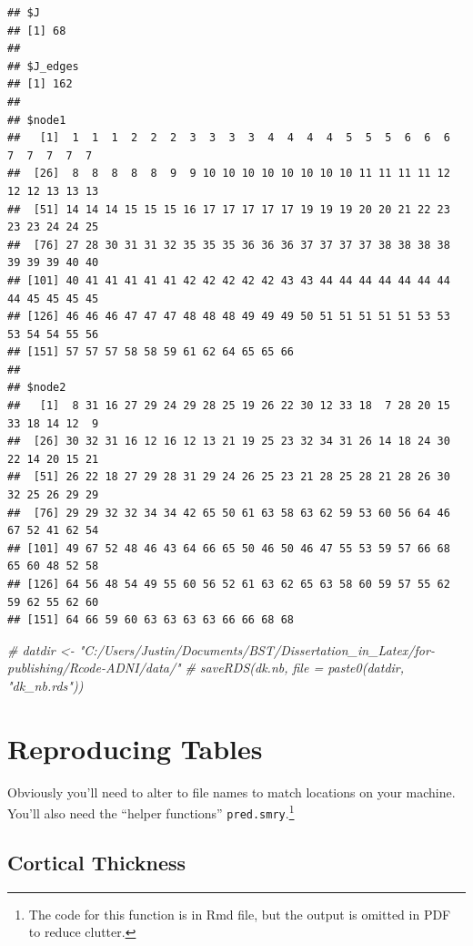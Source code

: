 \documentclass[
]{article}
\newenvironment{Shaded}{\begin{snugshade}}{\end{snugshade}}
\newcommand{\CommentTok}[1]{\textcolor[rgb]{0.56,0.35,0.01}{\textit{#1}}}
\begin{document}
\begin{verbatim}
## $J
## [1] 68
## 
## $J_edges
## [1] 162
## 
## $node1
##   [1]  1  1  1  2  2  2  3  3  3  3  4  4  4  4  5  5  5  6  6  6  7  7  7  7  7
##  [26]  8  8  8  8  8  9  9 10 10 10 10 10 10 10 10 11 11 11 11 12 12 12 13 13 13
##  [51] 14 14 14 15 15 15 16 17 17 17 17 17 19 19 19 20 20 21 22 23 23 23 24 24 25
##  [76] 27 28 30 31 31 32 35 35 35 36 36 36 37 37 37 37 38 38 38 38 39 39 39 40 40
## [101] 40 41 41 41 41 41 42 42 42 42 42 43 43 44 44 44 44 44 44 44 44 45 45 45 45
## [126] 46 46 46 47 47 47 48 48 48 49 49 49 50 51 51 51 51 51 53 53 53 54 54 55 56
## [151] 57 57 57 58 58 59 61 62 64 65 65 66
## 
## $node2
##   [1]  8 31 16 27 29 24 29 28 25 19 26 22 30 12 33 18  7 28 20 15 33 18 14 12  9
##  [26] 30 32 31 16 12 16 12 13 21 19 25 23 32 34 31 26 14 18 24 30 22 14 20 15 21
##  [51] 26 22 18 27 29 28 31 29 24 26 25 23 21 28 25 28 21 28 26 30 32 25 26 29 29
##  [76] 29 29 32 32 34 34 42 65 50 61 63 58 63 62 59 53 60 56 64 46 67 52 41 62 54
## [101] 49 67 52 48 46 43 64 66 65 50 46 50 46 47 55 53 59 57 66 68 65 60 48 52 58
## [126] 64 56 48 54 49 55 60 56 52 61 63 62 65 63 58 60 59 57 55 62 59 62 55 62 60
## [151] 64 66 59 60 63 63 63 63 66 66 68 68
\end{verbatim}

\begin{Shaded}
\begin{Highlighting}[]
\CommentTok{# datdir <- "C:/Users/Justin/Documents/BST/Dissertation_in_Latex/for-publishing/Rcode-ADNI/data/"}
\CommentTok{# saveRDS(dk.nb, file = paste0(datdir, "dk_nb.rds"))}
\end{Highlighting}
\end{Shaded}

\hypertarget{reproducing-tables}{%
\section{Reproducing Tables}\label{reproducing-tables}}

Obviously you'll need to alter to file names to match locations on your
machine. You'll also need the ``helper functions''
\texttt{pred.smry}.\footnote{The code for this function is in Rmd file, but the output is omitted in PDF to reduce clutter.}

\hypertarget{cortical-thickness-1}{%
\subsection{Cortical Thickness}\label{cortical-thickness-1}}
\end{document}
